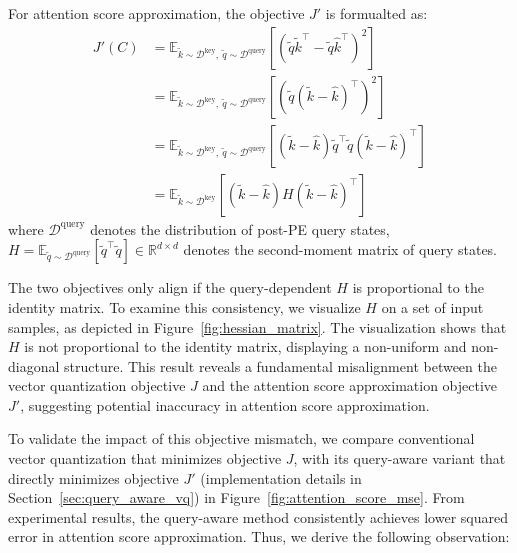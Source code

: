 For attention score approximation, the objective \(J'\) is formualted as:
\begin{equation}
    \label{eq:objective_attention_score_approximation}
    \begin{aligned}
        J'(C) & = \mathbb E_{\tilde k \sim \mathcal D^\mathrm{key},\ \tilde q \sim \mathcal D^\mathrm{query}}[(\tilde q \tilde k^\top - \tilde q \hat k^\top)^2] \\
        & = \mathbb E_{\tilde k \sim \mathcal D^\mathrm{key},\ \tilde q \sim \mathcal D^\mathrm{query}}[(\tilde q (\tilde k - \hat k)^\top)^2] \\
        & = \mathbb E_{\tilde k \sim \mathcal D^\mathrm{key},\ \tilde q \sim \mathcal D^\mathrm{query}}[(\tilde k - \hat k) \tilde q^\top \tilde q (\tilde k - \hat k)^\top] \\
        &= \mathbb E_{\tilde k \sim \mathcal D^\mathrm{key}} [(\tilde k - \hat k) H (\tilde k - \hat k)^\top]
    \end{aligned}
\end{equation}
where \(\mathcal D^\mathrm{query}\) denotes the distribution of post-PE query states, 
\(H = \mathbb E_{\tilde q \sim \mathcal D^\mathrm{query}}[\tilde q^\top \tilde q] \in \mathbb R^{d \times d}\) denotes the second-moment matrix of query states.

The two objectives only align if the query-dependent \(H\) is proportional to the identity matrix.
To examine this consistency, we visualize \(H\) on a set of input samples,
as depicted in Figure~\ref{fig:hessian_matrix}.
The visualization shows that \( H \) is not proportional to the identity matrix, displaying a non-uniform and non-diagonal structure.
This result reveals a fundamental misalignment between the vector quantization objective \(J\) and the attention score approximation objective \(J'\), suggesting potential inaccuracy in attention score approximation.

To validate the impact of this objective mismatch, we compare conventional vector quantization that minimizes objective \(J\), with its query-aware variant that directly minimizes objective \(J'\) (implementation details in Section~\ref{sec:query_aware_vq}) in Figure~\ref{fig:attention_score_mse}. 
From experimental results, the query-aware method consistently achieves lower squared error in attention score approximation.
Thus, we derive the following observation:

